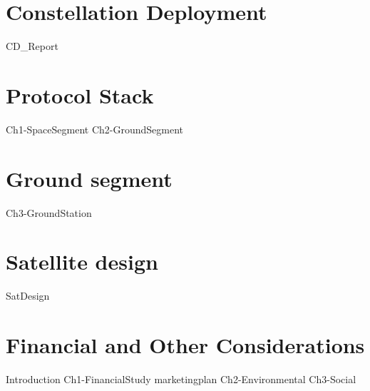 \part{Constellation Deployment}
{CD_Report}

\part{Protocol Stack}
{Ch1-SpaceSegment}
{Ch2-GroundSegment}

\part{Ground segment}
{Ch3-GroundStation}

\part{Satellite design}
{SatDesign}

\part{Financial and Other Considerations}
{Introduction}
{Ch1-FinancialStudy}
{marketingplan}
{Ch2-Environmental}
{Ch3-Social}






 

